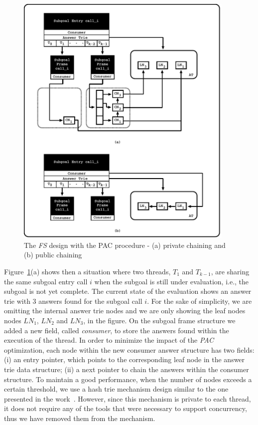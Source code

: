 \documentclass{llncs}
\begin{document}
\begin{figure}[!ht]
\vspace{-\intextsep}
\centering
\includegraphics[width=10.5cm]{figures/pcc.pdf}
\caption{The \emph{FS} design with the PAC procedure - (a) private
  chaining and (b) public chaining}
\label{fig_tabtries_pcc}
\vspace{-1.0\intextsep}
\end{figure}

Figure~\ref{fig_tabtries_pcc}(a) shows then a situation where two
threads, $T_1$ and $T_{k-1}$, are sharing the same subgoal entry call
$i$ when the subgoal is still under evaluation, i.e., the subgoal is
not yet complete. The current state of the evaluation shows an answer
trie with $3$ answers found for the subgoal call $i$. For the sake of
simplicity, we are omitting the internal answer trie nodes and we are
only showing the leaf nodes nodes $LN_1$, $LN_2$ and $LN_3$, in the
figure. %
On the subgoal frame structure we added a new field, called
\emph{consumer}, to store the answers found within the execution of
the thread. In order to minimize the impact of the \emph{PAC}
optimization, each node within the new consumer answer structure has
two fields: (i) an entry pointer, which points to the corresponding
leaf node in the answer trie data structure; (ii) a next pointer to
chain the answers within the consumer structure. To maintain a good
performance, when the number of nodes exceeds a certain threshold, we
use a hash trie mechanism design similar to the one presented in the
work~\cite{Areias-ijpp15}. However, since this mechanism is private to
each thread, it does not require any of the tools that were necessary
to support concurrency, thus we have removed them from the mechanism.
\end{document}
